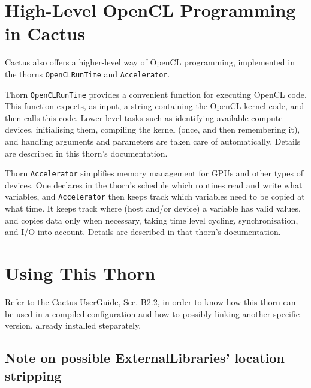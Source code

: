 \section{High-Level OpenCL Programming in Cactus}

Cactus also offers a higher-level way of OpenCL programming,
implemented in the thorns \texttt{OpenCLRunTime} and
\texttt{Accelerator}.

Thorn \texttt{OpenCLRunTime} provides a convenient function for
executing OpenCL code. This function expects, as input, a string
containing the OpenCL kernel code, and then calls this code.
Lower-level tasks such as identifying available compute devices,
initialising them, compiling the kernel (once, and then remembering
it), and handling arguments and parameters are taken care of
automatically. Details are described in this thorn's documentation.

Thorn \texttt{Accelerator} simplifies memory management for GPUs and
other types of devices. One declares in the thorn's schedule which
routines read and write what variables, and \texttt{Accelerator} then
keeps track which variables need to be copied at what time. It keeps
track where (host and/or device) a variable has valid values, and
copies data only when necessary, taking time level cycling,
synchronisation, and I/O into account. Details are described in that
thorn's documentation.

\section{Using This Thorn}

Refer to the Cactus UserGuide, Sec. B2.2, in order to know how this thorn can be used in a compiled configuration and how to possibly linking another specific version, already installed steparately.

\subsection*{Note on possible ExternalLibraries' location stripping}
\label{stripping}

